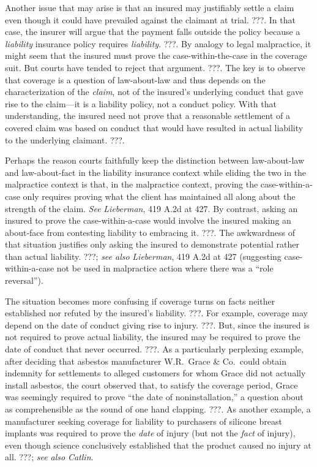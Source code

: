 \documentclass[
  12pt,
  letterpaper,
]{scrartcl}
\begin{document}
Another issue that may arise is that an insured may justifiably settle a claim
even though it could have prevailed against the claimant at trial. ???. In that
case, the insurer will argue that the payment falls outside the policy because
a \emph{liability} insurance policy requires \emph{liability}. ???. By analogy
to legal malpractice, it might seem that the insured must prove the
case-within-the-case in the coverage suit. But courts have tended to reject
that argument. ???. The key is to observe that coverage is a question of
law-about-law and thus depends on the characterization of the \emph{claim}, not
of the insured's underlying conduct that gave rise to the claim---it is a
liability policy, not a conduct policy. With that understanding, the insured
need not prove that a reasonable settlement of a covered claim was based on
conduct that would have resulted in actual liability to the underlying
claimant. ???.

Perhaps the reason courts faithfully keep the distinction between
law-about-law and law-about-fact in the liability insurance context while
eliding the two in the malpractice context is that, in the malpractice context,
proving the case-within-a-case only requires proving what the client has
maintained all along about the strength of the claim. \textit{See}
\textit{Lieberman}, 419 A.2d at 427. By contrast, asking an insured to prove
the case-within-a-case would involve the insured making an about-face from
contesting liability to embracing it. ???. The awkwardness of that situation
justifies only asking the insured to demonstrate potential rather than actual
liability. ???; \textit{see also} \textit{Lieberman}, 419 A.2d at 427
(suggesting case-within-a-case not be used in malpractice action where there
was a ``role reversal'').

The situation becomes more confusing if coverage turns on facts neither
established nor refuted by the insured's liability. ???. For example, coverage
may depend on the date of conduct giving rise to injury. ???. But, since the
insured is not required to prove actual liability, the insured may be required
to prove the date of conduct that never occurred. ???. As a particularly
perplexing example, after deciding that asbestos manufacturer W.R.~Grace \&
Co.~could obtain indemnity for settlements to alleged customers for whom Grace
did not actually install asbestos, the court observed that, to satisfy the
coverage period, Grace was seemingly required to prove ``the date of
noninstallation,'' a question about as comprehensible as the sound of one hand
clapping. ???. As another example, a manufacturer seeking coverage for
liability to purchasers of silicone breast implants was required to prove the
\emph{date} of injury (but not the \emph{fact} of injury), even though science
conclusively established that the product caused no injury at all. ???;
\textit{see also} \textit{Catlin}.
\end{document}
